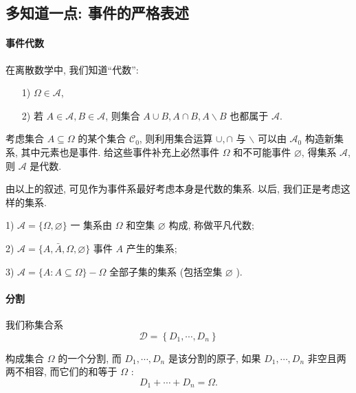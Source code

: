 
\subsection*{多知道一点: 事件的严格表述}

\paragraph{事件代数}

在离散数学中, 我们知道``代数'':
\begin{itemize}
    \item [1)] $\Omega \in \mathscr{A}$,
    \item    [2)] 若 $A \in \mathscr{A}, B \in \mathscr{A}$, 则集合 $A \cup B, A \cap B, A \backslash B$ 也都属于 $\mathscr{A}$.
    
\end{itemize}
考虑集合 $A \subseteq \Omega$ 的某个集合 $\mathscr{C}_0$, 则利用集合运算 $\cup, \cap$ 与 $\backslash$ 可以由 $\mathscr{A}_0$ 构造新集系, 其中元素也是事件. 给这些事件补充上必然事件 $\Omega$ 和不可能事件 $\varnothing$, 得集系 $\mathscr{A}$, 则 $\mathscr{A}$ 是代数. 

由以上的叙述, 可见作为事件系最好考虑本身是代数的集系. 以后, 我们正是考虑这样的集系.

\begin{example}
    1) $\mathscr{A}=\{\Omega, \varnothing\}$ 一 集系由 $\Omega$ 和空集 $\varnothing$ 构成, 称做平凡代数; 
    
    2) $\mathscr{A}=\{A, \bar{A}, \Omega, \varnothing\}$ 事件 $A$ 产生的集系;

    3) $\mathscr{A}=\{A: A \subseteq \Omega\}-\Omega$ 全部子集的集系 (包括空集 $\varnothing$ ).
\end{example}

\paragraph{分割} 我们称集合系
$$
\mathscr{D}=\left\{D_1, \cdots, D_n\right\}
$$

构成集合 $\Omega$ 的一个分割, 而 $D_1, \cdots, D_n$ 是该分割的原子, 如果 $D_1, \cdots, D_n$ 非空且两两不相容, 而它们的和等于 $\Omega$ :
$$
D_1+\cdots+D_n=\Omega .
$$
